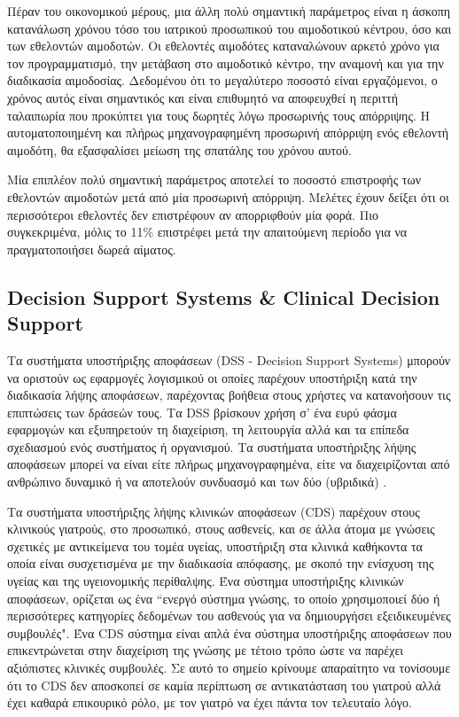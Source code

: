 		Πέραν του οικονομικού μέρους, μια άλλη πολύ σημαντική παράμετρος είναι η άσκοπη κατανάλωση χρόνου τόσο του ιατρικού προσωπικού του αιμοδοτικού κέντρου, όσο και των εθελοντών αιμοδοτών. Οι εθελοντές αιμοδότες καταναλώνουν αρκετό χρόνο για τον προγραμματισμό, την μετάβαση στο αιμοδοτικό κέντρο, την αναμονή και για την διαδικασία αιμοδοσίας.  Δεδομένου ότι το μεγαλύτερο ποσοστό είναι εργαζόμενοι, ο χρόνος αυτός είναι σημαντικός και είναι επιθυμητό να αποφευχθεί η περιττή ταλαιπωρία που προκύπτει για τους δωρητές λόγω προσωρινής τους απόρριψης. Η αυτοματοποιημένη και πλήρως μηχανογραφημένη προσωρινή απόρριψη ενός εθελοντή αιμοδότη, θα εξασφαλίσει μείωση της σπατάλης του χρόνου αυτού.
		
		Μία επιπλέον πολύ σημαντική παράμετρος αποτελεί το ποσοστό επιστροφής των εθελοντών αιμοδοτών μετά από μία προσωρινή απόρριψη. Μελέτες έχουν δείξει ότι οι περισσότεροι εθελοντές δεν επιστρέφουν αν απορριφθούν μία φορά. Πιο συγκεκριμένα, μόλις το 11\% επιστρέφει μετά την απαιτούμενη περίοδο για να πραγματοποιήσει δωρεά αίματος\cite{halperin1998effect}.
	
		
	\subsection{Decision Support Systems \& Clinical Decision Support}
		Τα συστήματα υποστήριξης αποφάσεων (DSS - Decision Support Systems) μπορούν να οριστούν ως εφαρμογές λογισμικού οι οποίες παρέχουν υποστήριξη κατά την διαδικασία λήψης αποφάσεων, παρέχοντας βοήθεια στους χρήστες να κατανοήσουν τις επιπτώσεις των δράσεών τους\cite{french2000decision}. Τα DSS βρίσκουν χρήση σ' ένα ευρύ φάσμα εφαρμογών και εξυπηρετούν τη διαχείριση, τη λειτουργία αλλά και τα επίπεδα σχεδιασμού ενός συστήματος ή οργανισμού. Τα συστήματα υποστήριξης λήψης αποφάσεων μπορεί να είναι είτε πλήρως μηχανογραφημένα, είτε να διαχειρίζονται από ανθρώπινο δυναμικό  ή να αποτελούν συνδυασμό και των δύο (υβριδικά) \cite{miller}. 
		
		Τα συστήματα υποστήριξης λήψης κλινικών αποφάσεων (CDS) παρέχουν στους κλινικούς γιατρούς, στο προσωπικό, στους ασθενείς, και σε άλλα άτομα με γνώσεις σχετικές με αντικείμενα του τομέα υγείας, υποστήριξη στα κλινικά καθήκοντα τα οποία είναι συσχετισμένα με την διαδικασία απόφασης, με σκοπό  την ενίσχυση της υγείας και της υγειονομικής περίθαλψης\cite{clinicalDecision}. Ένα σύστημα υποστήριξης κλινικών αποφάσεων, ορίζεται ως ένα ``ενεργό σύστημα γνώσης, το οποίο χρησιμοποιεί δύο ή περισσότερες κατηγορίες δεδομένων του ασθενούς για να δημιουργήσει εξειδικευμένες συμβουλές". Ένα CDS σύστημα είναι απλά ένα σύστημα υποστήριξης αποφάσεων που επικεντρώνεται στην διαχείριση της γνώσης με τέτοιο τρόπο ώστε να παρέχει αξιόπιστες κλινικές συμβουλές. Σε αυτό το σημείο κρίνουμε απαραίτητο να τονίσουμε ότι το CDS δεν αποσκοπεί σε καμία περίπτωση σε αντικατάσταση του γιατρού αλλά έχει καθαρά επικουρικό ρόλο, με τον γιατρό να έχει πάντα τον τελευταίο λόγο\cite{miller}.
		
